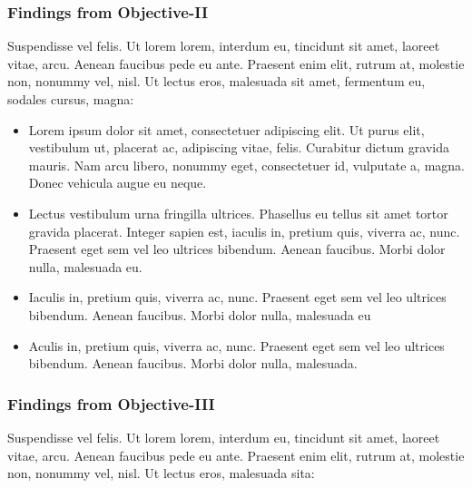 \documentclass{article}
\begin{document}
\subsubsection{Findings from Objective-II}
Suspendisse vel felis. Ut lorem lorem, interdum eu, tincidunt sit amet, laoreet vitae, arcu. Aenean faucibus pede eu ante. Praesent enim elit, rutrum at, molestie non, nonummy vel, nisl. Ut lectus eros, malesuada sit amet, fermentum eu, sodales cursus, magna: 

\begin{itemize}
    \item Lorem ipsum dolor sit amet, consectetuer adipiscing elit. Ut purus elit, vestibulum ut, placerat ac,
    adipiscing vitae, felis. Curabitur dictum gravida mauris. Nam arcu libero, nonummy eget, consectetuer id, vulputate a, magna. Donec vehicula augue eu neque.

    \item Lectus vestibulum urna fringilla ultrices. Phasellus eu tellus sit amet tortor gravida placerat. Integer
    sapien est, iaculis in, pretium quis, viverra ac, nunc. Praesent eget sem vel leo ultrices bibendum.
    Aenean faucibus. Morbi dolor nulla, malesuada eu.

    \item Iaculis in, pretium quis, viverra ac, nunc. Praesent eget sem vel leo ultrices bibendum. Aenean faucibus. Morbi dolor nulla, malesuada eu

    \item Aculis in, pretium quis, viverra ac, nunc. Praesent eget sem vel leo ultrices bibendum. Aenean faucibus. Morbi dolor nulla, malesuada.

\end{itemize}

\subsubsection{Findings from Objective-III}
Suspendisse vel felis. Ut lorem lorem, interdum eu, tincidunt sit amet, laoreet vitae, arcu. Aenean faucibus pede eu ante. Praesent enim elit, rutrum at, molestie non, nonummy vel, nisl. Ut lectus eros, malesuada sita: 
\end{document}
